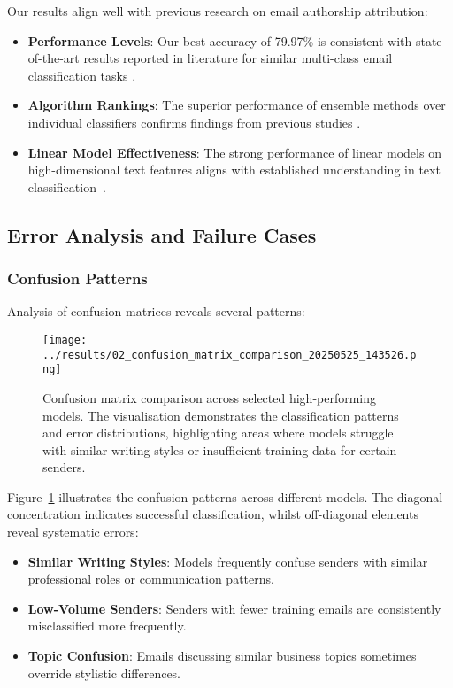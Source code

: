 \documentclass[11pt,a4paper]{article}
\begin{document}
Our results align well with previous research on email authorship attribution:

\begin{itemize}
    \item \textbf{Performance Levels}: Our best accuracy of 79.97\% is consistent with state-of-the-art results reported in literature for similar multi-class email classification tasks \cite{iqbal2013forensic}.
    
    \item \textbf{Algorithm Rankings}: The superior performance of ensemble methods over individual classifiers confirms findings from previous studies \cite{stamatatos2009survey}.
    
    \item \textbf{Linear Model Effectiveness}: The strong performance of linear models on high-dimensional text features aligns with established understanding in text classification~\cite{sebastiani2002machine}.
\end{itemize}

\subsection{Error Analysis and Failure Cases}

\subsubsection{Confusion Patterns}

Analysis of confusion matrices reveals several patterns:

\begin{figure}[H]
    \centering
    \texttt{[image: ../results/02\_confusion\_matrix\_comparison\_20250525\_143526.png]}
    \caption{Confusion matrix comparison across selected high-performing models. The visualisation demonstrates the classification patterns and error distributions, highlighting areas where models struggle with similar writing styles or insufficient training data for certain senders.}
    \label{fig:confusion_matrices}
\end{figure}

Figure~\ref{fig:confusion_matrices} illustrates the confusion patterns across different models. The diagonal concentration indicates successful classification, whilst off-diagonal elements reveal systematic errors:

\begin{itemize}
    \item \textbf{Similar Writing Styles}: Models frequently confuse senders with similar professional roles or communication patterns.
    
    \item \textbf{Low-Volume Senders}: Senders with fewer training emails are consistently misclassified more frequently.
    
    \item \textbf{Topic Confusion}: Emails discussing similar business topics sometimes override stylistic differences.
\end{itemize}
\end{document}
